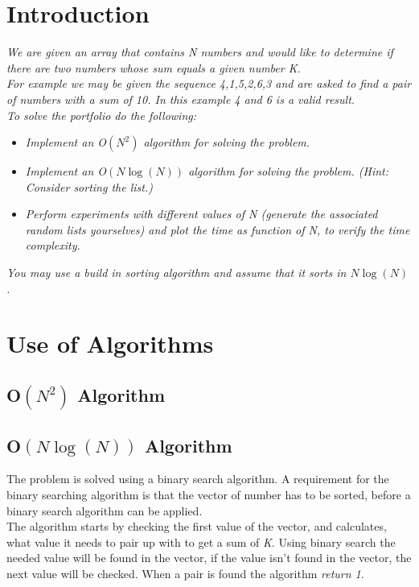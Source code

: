 \section{Introduction}
\emph{We are given an array that contains N numbers and would like to determine if there are two numbers whose sum equals a given number K.\\
For example we may be given the sequence 4,1,5,2,6,3 and are asked to find a pair of numbers with a sum of 10. In this example 4 and 6 is a valid result.\\
To solve the portfolio do the following:}
\begin{itemize}

\item \emph{Implement an O\(\left( { N }^{ 2 } \right)\) algorithm for solving the problem.}
\item \emph{Implement an O\(\left( N\log {(N)}  \right) \) algorithm for solving the problem. (Hint: Consider sorting the list.)}
\item \emph{Perform experiments with different values of N (generate the associated random lists yourselves)
and plot the time as function of N, to verify the time complexity.}
\end{itemize}
\emph{You may use a build in sorting algorithm and assume that it sorts in \( N\log {(N) }  \).}

\section{Use of Algorithms}
\subsection{O\(\left( { N }^{ 2 } \right)\) Algorithm}

\subsection{O\(\left( N\log {(N)}  \right) \) Algorithm}
The problem is solved using a binary search algorithm. A requirement for the binary searching algorithm is that the vector of number has to be sorted, before a binary search algorithm can be applied. \\
The algorithm starts by checking the first value of the vector, and calculates, what value it needs to pair up with to get a sum of \emph{K}.  Using binary search the needed value will be found in the vector, if the value isn't found in the vector, the next value will be checked.  When a pair is found the algorithm \emph{return 1}. \\

